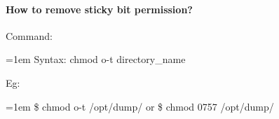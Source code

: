 \begin{flushleft}
\paragraph{How to remove sticky bit permission?}
\bigskip
Command:
\begin{tcolorbox}[breakable,notitle,boxrule=0pt,colback=pink,colframe=pink]
	\color{black}
	\font=1em
	Syntax: chmod o-t directory\_name
	\font=4pt
\end{tcolorbox}
Eg:
\begin{tcolorbox}[breakable,notitle,boxrule=-0pt,colback=black,colframe=black]
	\color{green}
	\font=1em
	\$ chmod o-t /opt/dump/
	\newline
	or
	\newline
	\$ chmod 0757 /opt/dump/
	\font=4pt
\end{tcolorbox}
	
	
\end{flushleft}

\newpage

